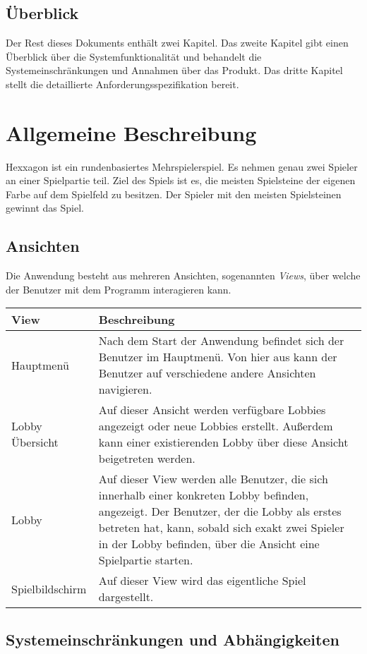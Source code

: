 \documentclass{uulm-assignment}
\begin{document}
\subsection{Überblick}

Der Rest dieses Dokuments enthält zwei Kapitel. Das zweite Kapitel gibt einen Überblick über die
Systemfunktionalität und behandelt die Systemeinschränkungen und Annahmen über das Produkt.
Das dritte Kapitel stellt die detaillierte Anforderungsspezifikation bereit.

\section{Allgemeine Beschreibung}

Hexxagon ist ein rundenbasiertes Mehrspielerspiel. Es nehmen genau zwei Spieler an einer Spielpartie teil. Ziel des Spiels ist es, die meisten Spielsteine der eigenen Farbe auf dem Spielfeld zu besitzen. Der Spieler mit den meisten Spielsteinen gewinnt das Spiel.

\subsection{Ansichten}

Die Anwendung besteht aus mehreren Ansichten, sogenannten \textit{Views}, über welche der Benutzer mit dem Programm interagieren kann.

\begin{tabularx}{16cm}{l|X}
\textbf{View} & \textbf{Beschreibung} \\
\hline
Hauptmenü & Nach dem Start der Anwendung befindet sich der Benutzer im Hauptmenü. Von hier aus kann der Benutzer auf verschiedene andere Ansichten navigieren. \\
\hline
Lobby Übersicht & Auf dieser Ansicht werden verfügbare Lobbies angezeigt oder neue Lobbies erstellt. Außerdem kann einer existierenden Lobby über diese Ansicht beigetreten werden. \\
\hline
Lobby & Auf dieser View werden alle Benutzer, die sich innerhalb einer konkreten Lobby befinden, angezeigt. Der Benutzer, der die Lobby als erstes betreten hat, kann, sobald sich exakt zwei Spieler in der Lobby befinden, über die Ansicht eine Spielpartie starten. \\
\hline
Spielbildschirm & Auf dieser View wird das eigentliche Spiel dargestellt. \\
\end{tabularx}

\subsection{Systemeinschränkungen und Abhängigkeiten}
\end{document}
